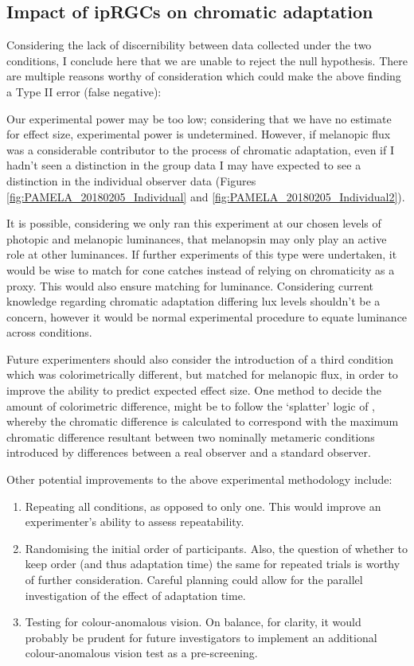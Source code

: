 \subsection{Impact of ipRGCs on chromatic adaptation}

Considering the lack of discernibility between data collected under the two conditions, I conclude here that we are unable to reject the null hypothesis. There are multiple reasons worthy of consideration which could make the above finding a Type II error (false negative): 

Our experimental power may be too low; considering that we have no estimate for effect size, experimental power is undetermined. However, if melanopic flux was a considerable contributor to the process of chromatic adaptation, even if I hadn't seen a distinction in the group data I may have expected to see a distinction in the individual observer data (Figures \ref{fig:PAMELA_20180205_Individual} and \ref{fig:PAMELA_20180205_Individual2}).

It is possible, considering we only ran this experiment at our chosen levels of photopic and melanopic luminances, that melanopsin may only play an active role at other luminances. If further experiments of this type were undertaken, it would be wise to match for cone catches instead of relying on chromaticity as a proxy. This would also ensure matching for luminance. Considering current knowledge regarding chromatic adaptation differing lux levels shouldn't be a concern, however it would be normal experimental procedure to equate luminance across conditions.

Future experimenters should also consider the introduction of a third condition which was colorimetrically different, but matched for melanopic flux, in order to improve the ability to predict expected effect size. One method to decide the amount of colorimetric difference, might be to follow the `splatter' logic of \citet{spitschan_human_2016}, whereby the chromatic difference is calculated to correspond with the maximum chromatic difference resultant between two nominally metameric conditions introduced by differences between a real observer and a standard observer.

Other potential improvements to the above experimental methodology include:

\begin{enumerate}
    \item Repeating all conditions, as opposed to only one. This would improve an experimenter's ability to assess repeatability.
    \item Randomising the initial order of participants. Also, the question of whether to keep order (and thus adaptation time) the same for repeated trials is worthy of further consideration. Careful planning could allow for the parallel investigation of the effect of adaptation time.
    \item Testing for colour-anomalous vision. On balance, for clarity, it would probably be prudent for future investigators to implement an additional colour-anomalous vision test as a pre-screening.
\end{enumerate}

